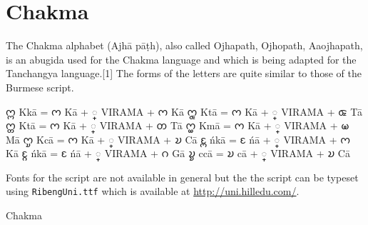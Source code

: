 
\section{Chakma}
\label{s:chakma}

\newfontfamily{}

The Chakma alphabet (Ajhā pāṭh), also called Ojhapath, Ojhopath, Aaojhapath, is an abugida used for the Chakma language and which is being adapted for the Tanchangya language.[1] The forms of the letters are quite similar to those of the Burmese script.

\bgroup
\obeylines
\chakma
𑄇𑄳𑄇 Kkā = 𑄇 Kā + 𑄳 VIRAMA + 𑄇 Kā
𑄇𑄳𑄑 Ktā = 𑄇 Kā + 𑄳 VIRAMA + 𑄑 Tā
𑄇𑄳𑄖 Ktā = 𑄇 Kā + 𑄳 VIRAMA + 𑄖 Tā
𑄇𑄳𑄟 Kmā = 𑄇 Kā + 𑄳 VIRAMA + 𑄟 Mā
𑄇𑄳𑄌 Kcā = 𑄇 Kā + 𑄳 VIRAMA + 𑄌 Cā
𑄋𑄳𑄇 ńkā = 𑄋 ńā + 𑄳 VIRAMA + 𑄇 Kā
𑄋𑄳𑄉 ńkā = 𑄋 ńā + 𑄳 VIRAMA + 𑄉 Gā
𑄌𑄳𑄌 ccā = 𑄌 cā + 𑄳 VIRAMA + 𑄌 Cā

\egroup

Fonts for the script are not available in general but the
the script can be typeset using \texttt{RibengUni.ttf} which is available at \url{http://uni.hilledu.com/}. 

\begin{scriptexample}[]{Chakma}
\end{scriptexample}


